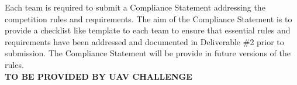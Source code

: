 Each team is required to submit a Compliance Statement addressing the competition rules and requirements. The aim of the Compliance Statement is to provide a checklist like template to each team to ensure that essential rules and requirements have been addressed and documented in Deliverable \#2 prior to submission. The Compliance Statement will be provide in future versions of the rules.\\

\textbf{TO BE PROVIDED BY UAV CHALLENGE}